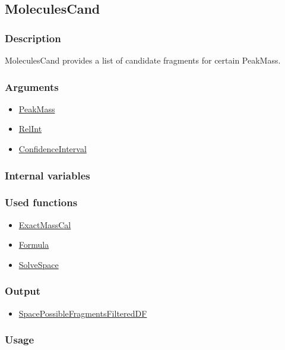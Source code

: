 \subsection{MoleculesCand}\label{MoleculesCand}
\subsubsection{Description}
MoleculesCand provides a list of candidate fragments for certain PeakMass.
\subsubsection{Arguments}
\begin{itemize}
\item \hyperref[PeakMass]{PeakMass}
\item \hyperref[RelInt]{RelInt}     
\item \hyperref[ConfidenceInterval]{ConfidenceInterval}
\end{itemize}
\subsubsection{Internal variables}
\subsubsection{Used functions}
\begin{itemize}
\item \hyperref[ExactMassCal]{ExactMassCal}
\item \hyperref[Formula]{Formula}
\item \hyperref[SolveSpace]{SolveSpace}
\end{itemize}
\subsubsection{Output}
\begin{itemize}
\item \hyperref[SpacePossibleFragmentsFilteredDF]{SpacePossibleFragmentsFilteredDF}
\end{itemize}
\subsubsection{Usage}


